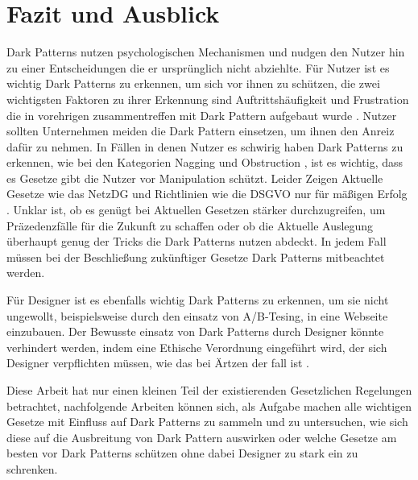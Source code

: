 \documentclass[conference,compsoc,final,a4paper]{IEEEtran}
\begin{document}
\section{Fazit und Ausblick}
Dark Patterns nutzen psychologischen Mechanismen und nudgen den Nutzer hin zu einer Entscheidungen die er ursprünglich nicht abziehlte. Für Nutzer ist es wichtig Dark Patterns zu erkennen, um sich vor ihnen zu schützen, die zwei wichtigsten Faktoren zu ihrer Erkennung sind Auftrittshäufigkeit und Frustration die in vorehrigen zusammentreffen mit Dark Pattern aufgebaut wurde \autocite{M.Bhoot2020}. Nutzer sollten Unternehmen meiden die Dark Pattern einsetzen, um ihnen den Anreiz dafür zu nehmen. In Fällen in denen Nutzer es schwirig haben Dark Patterns zu erkennen, wie bei den Kategorien Nagging und Obstruction \autocites{Gray_2018}{M.Bhoot2020}, ist es wichtig, dass es Gesetze gibt die Nutzer vor Manipulation schützt. Leider Zeigen Aktuelle Gesetze wie das \ac{NetzDG} und Richtlinien wie die \ac{DSGVO} nur für mäßigen Erfolg \autocites{Nouwens2020}{Soe2020}. Unklar ist, ob es genügt bei Aktuellen Gesetzen stärker durchzugreifen, um Präzedenzfälle für die Zukunft zu schaffen \autocite{Rieger2020} oder ob die Aktuelle Auslegung überhaupt genug der Tricks die Dark Patterns nutzen abdeckt. In jedem Fall müssen bei der Beschließung zukünftiger Gesetze Dark Patterns mitbeachtet werden.

Für Designer ist es ebenfalls wichtig Dark Patterns zu erkennen, um sie nicht ungewollt, beispielsweise durch den einsatz von A/B-Tesing, in eine Webseite einzubauen. Der Bewusste einsatz von Dark Patterns durch Designer könnte verhindert werden, indem eine Ethische Verordnung eingeführt wird, der sich Designer verpflichten müssen, wie das bei Ärtzen der fall ist \autocite{Gray_2018}.

Diese Arbeit hat nur einen kleinen Teil der existierenden Gesetzlichen Regelungen betrachtet, nachfolgende Arbeiten können sich, als Aufgabe machen alle wichtigen Gesetze mit Einfluss auf Dark Patterns zu sammeln und zu untersuchen, wie sich diese auf die Ausbreitung von Dark Pattern auswirken oder welche Gesetze am besten vor Dark Patterns schützen ohne dabei Designer zu stark ein zu schrenken. 


\end{document}
